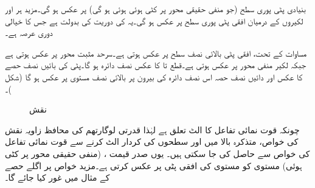 بنیادی پٹی  پوری  سطح  (جو منفی حقیقی محور پر کٹی ہوئی ہوئی ہو گی) پر عکس ہو گی۔مزید ہر  اور  لکیروں کے درمیان افقی پٹی  پوری  سطح پر عکس ہو گی۔یہ  کی دوریت کی بدولت ہے جس کا خیالی دوری عرصہ  ہے۔

مساوات  کے تحت، افقی پٹی  بالائی نصف  سطح پر عکس ہوتی ہے۔سرحد  مثبت   محور پر عکس ہوتی ہے جبکہ لکیر  منفی  محور پر عکس ہوتی ہے۔قطع  تا  کا عکس نصف دائرہ  ہو گا۔پٹی کی بائیں نصف  حصے کا عکس  اور دائیں نصف  حصہ  اس نصف دائرہ   کی بیرون پر بالائی نصف  مستوی پر عکس ہو گا (شکل )۔
\begin{figure}
\centering
\begin{subfigure}{0.45\textwidth}
\centering
{}
\end{subfigure}\hfill
\begin{subfigure}{0.45\textwidth}
\centering
{}
\end{subfigure} \hfill
\caption{نقش }
\label{شکل_نقش_قوت-نمائی_ب}
\end{figure}

چونکہ قوت نمائی تفاعل کا الٹ  تعلق    ہے لہٰذا قدرتی لوگارتھم کی محافظ زاویہ نقش کی خواص، متذکرہ بالا میں  اور  سطحوں کی کردار  الٹ کرنے سے  قوت نمائی تفاعل کی خواص سے حاصل کی جا سکتی ہیں۔ یوں صدر قیمت ، (منفی حقیقی محور پر کٹی ہوئی)   مستوی کو  مستوی کی افقی پٹی  پر عکس کرتی ہے۔مزید خواص پر اگلے حصے کے مثال  میں غور کیا جائے گا۔

